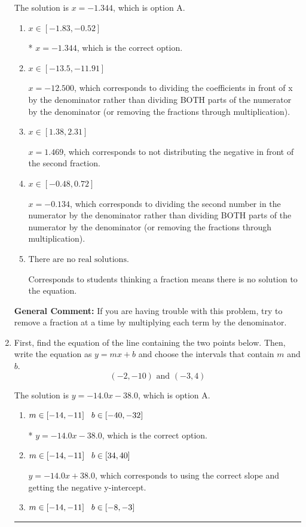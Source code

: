 \documentclass{extbook}[14pt]
\newcommand{\litem}[1]{\item #1

\rule{\textwidth}{0.4pt}}
\begin{document}
\begin{enumerate}
{The solution is \( x = -1.344 \), which is option A.\begin{enumerate}[label=\Alph*.]
\item \( x \in [-1.83, -0.52] \)

* $x = -1.344$, which is the correct option.
\item \( x \in [-13.5, -11.91] \)

 $x = -12.500$, which corresponds to dividing the coefficients in front of x by the denominator rather than dividing BOTH parts of the numerator by the denominator (or removing the fractions through multiplication).
\item \( x \in [1.38, 2.31] \)

 $x = 1.469$, which corresponds to not distributing the negative in front of the second fraction.
\item \( x \in [-0.48, 0.72] \)

 $x = -0.134$, which corresponds to dividing the second number in the numerator by the denominator rather than dividing BOTH parts of the numerator by the denominator (or removing the fractions through multiplication).
\item \( \text{There are no real solutions.} \)

Corresponds to students thinking a fraction means there is no solution to the equation.
\end{enumerate}

\textbf{General Comment:} If you are having trouble with this problem, try to remove a fraction at a time by multiplying each term by the denominator.
}
\litem{
First, find the equation of the line containing the two points below. Then, write the equation as $ y=mx+b $ and choose the intervals that contain $m$ and $b$.
\[ (-2, -10) \text{ and } (-3, 4) \]

The solution is \( y = -14.0x -38.0 \), which is option A.\begin{enumerate}[label=\Alph*.]
\item \( m \in [-14, -11] \hspace*{3mm} b \in [-40, -32] \)

* $y = -14.0x -38.0$, which is the correct option.
\item \( m \in [-14, -11] \hspace*{3mm} b \in [34, 40] \)

 $y = -14.0x + 38.0$, which corresponds to using the correct slope and getting the negative y-intercept.
\item \( m \in [-14, -11] \hspace*{3mm} b \in [-8, -3] \)


\end{enumerate}}
\end{enumerate}
\end{document}
